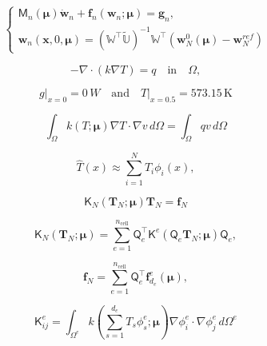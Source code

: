 \documentclass[11pt]{article}
\renewcommand{\vec}[1]{\mathbf{#1}}
\newcommand{\mat}[1]{\mathsf{#1}}
\begin{document}
\begin{equation}
\left\{
\begin{array}{l}
\mat{M}_n(\boldsymbol{\mu}) \dot{\vec{w}}_n + \vec{f}_n(\vec{w}_n; \boldsymbol{\mu}) = \vec{g}_n,\\
\vec{w}_n(\vec{x},0, \boldsymbol{\mu}) = (\mathbb{W}^\top \widetilde{\mathbb{U}})^{-1}\mathbb{W}^\top (\vec{w}_N^0(\boldsymbol{\mu})-\vec{w}^{ref}_N)
\end{array}
\right.
\label{eq:ROM_eq}
\end{equation}

\begin{equation}
-\nabla \cdot (k \nabla T) = q \quad \text{in} \quad \Omega,
\label{eq:heat_pde}
\end{equation}

\begin{equation}
   \left. g\right|_{x = 0} = 0\, \unit{W} \quad \text{and} \quad \left.T\right|_{x = 0.5} = 573.15 \, \text{K} 
\end{equation}

\begin{equation}
\int_{\Omega} k(T;\boldsymbol\mu)\nabla T \cdot \nabla v \, d\Omega  = \int_{\Omega} q v \, d\Omega 
\label{eq:weak_pde}
\end{equation}

\begin{equation}
\widehat{T}(x) \approx \sum_{i=1}^{N} T_i \phi_i(x),
\label{eq:FE_shape}
\end{equation}

\begin{equation}
\mat{K}_N(\vec{T}_N;\boldsymbol\mu) \vec{T}_N = \vec{f}_N
\label{eq:HC_HDM}
\end{equation}

\begin{equation}
\mat{K}_N(\mathbf{T}_N; \boldsymbol\mu) = \sum_{e=1}^{n_{\text{cell}}} \mat{Q}_e^\top \mat{K}^e (\mat{Q}_e\mathbf{T}_N; \boldsymbol\mu) \mat{Q}_e,
\label{eq:elemental_contrib_K}
\end{equation}

\begin{equation}
\mathbf{f}_N = \sum_{e=1}^{n_{\text{cell}}} \mat{Q}_e^\top \vec{f}^e_{d_e}(\boldsymbol\mu),
\label{eq:elemental_contrib_f}
\end{equation}

\begin{equation}
\mat{K}^e_{ij} = \int_{\Omega^{e}} k\left(\sum_{s=1}^{d_e} T_s \phi^e_s;\boldsymbol\mu\right) \nabla \phi^e_i \cdot \nabla \phi^e_j \, d\Omega^{e}
\label{eq:K_N_ij}
\end{equation}
\end{document}
